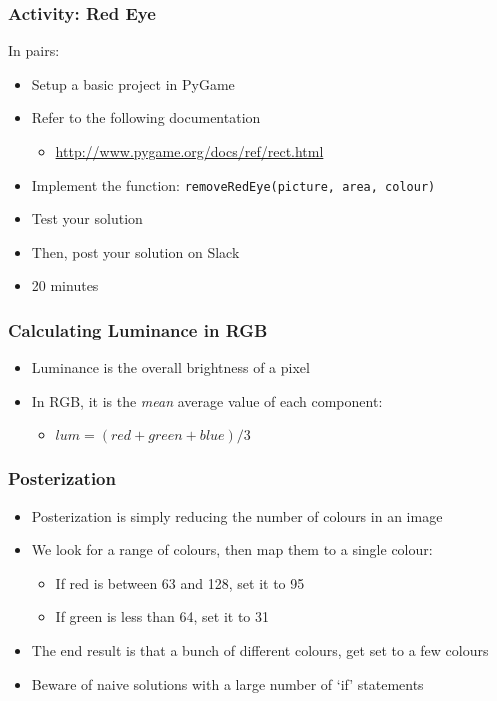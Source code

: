 
\begin{frame}
	\frametitle{Activity: Red Eye}
	
	In pairs:
	
	\vspace{2em}
	
	\begin{itemize}		
		\item Setup a basic project in PyGame
		\item Refer to the following documentation
		\begin{itemize}
			\item \url{http://www.pygame.org/docs/ref/rect.html}
		\end{itemize}
		\item Implement the function: \texttt{removeRedEye(picture, area, colour)}
		\item Test your solution
		\item Then, post your solution on Slack
		\item 20 minutes
	\end{itemize}
\end{frame}


\begin{frame}
	\frametitle{Calculating Luminance in RGB}
	
	\begin{itemize}		
		\item Luminance is the overall brightness of a pixel
		\item In RGB, it is the \textit{mean} average value of each component:
		\begin{itemize}
			\item $lum = (red + green + blue) / 3$
		\end{itemize}	
	\end{itemize}
\end{frame}

\begin{frame}
	\frametitle{Posterization}
	
	\begin{itemize}		
		\item Posterization is simply reducing the number of colours in an image
		\item We look for a range of colours, then map them to a single colour:
		\begin{itemize}
			\item If red is between 63 and 128, set it to 95
			\item If green is less than 64, set it to 31
		\end{itemize}	
		\item The end result is that a bunch of different colours, get set to a few colours
		\item Beware of naive solutions with a large number of `if' statements
	\end{itemize}
\end{frame}

